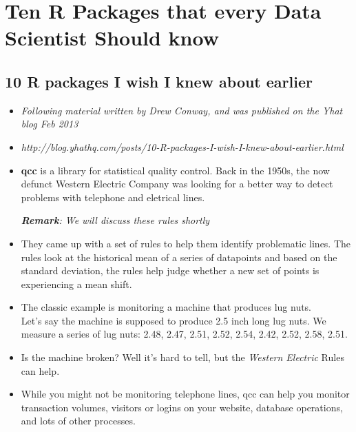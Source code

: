 \documentclass[]{article}
\begin{document}
\section{Ten R Packages that every Data Scientist Should know}

\subsection{10 R packages I wish I knew about earlier}
\begin{itemize}
\item \textit{Following material written by Drew Conway, and was published on the Yhat blog Feb 2013} \item \textit{http://blog.yhathq.com/posts/10-R-packages-I-wish-I-knew-about-earlier.html}
\end{itemize}

{\large
\begin{itemize}
\item \textbf{qcc} is a library for statistical quality control. Back in the 1950s, the now defunct Western Electric Company was looking for a better way to detect problems with telephone and eletrical lines.

\subitem \textit{\textbf{Remark}: We will discuss these rules shortly}

 \item They came up with a set of rules to help them identify problematic lines. The rules look at the historical mean of a series of datapoints and based on the standard deviation, the rules help judge whether a new set of points is experiencing a mean shift.

\item The classic example is monitoring a machine that produces lug nuts. \\ Let's say the machine is supposed to produce 2.5 inch long lug nuts. We measure a series of lug nuts: 2.48, 2.47, 2.51, 2.52, 2.54, 2.42, 2.52, 2.58, 2.51. \item  Is the machine broken? Well it's hard to tell, but the \textit{Western Electric} Rules can help.

\item While you might not be monitoring telephone lines, qcc can help you monitor transaction volumes, visitors or logins on your website, database operations, and lots of other processes.
\end{itemize}}
\newpage
\end{document}
